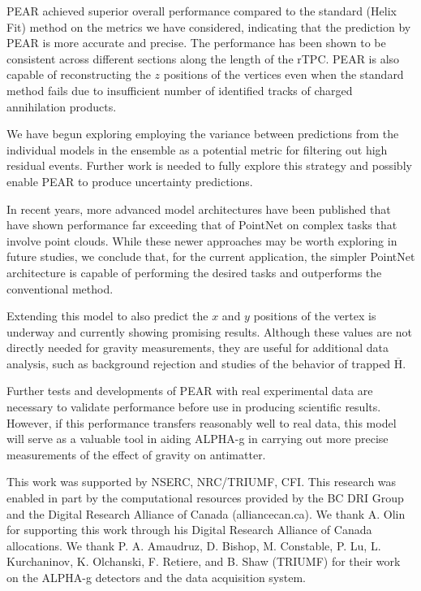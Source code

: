 \documentclass[a4paper,11pt]{article}
\begin{document}
PEAR achieved superior overall performance compared to the standard (Helix Fit) method on the metrics we have considered, indicating that the prediction by PEAR is more accurate and precise. The performance has been shown to be consistent across different sections along the length of the rTPC. PEAR is also capable of reconstructing the $z$ positions of the vertices even when the standard method fails due to insufficient number of identified tracks of charged annihilation products.

We have begun exploring employing the variance between predictions from the individual models in the ensemble as a potential metric for filtering out high residual events. Further work is needed to fully explore this strategy and possibly enable PEAR to produce uncertainty predictions.

In recent years, more advanced model architectures have been published \cite{pointnetpp, pointtransformerv3} that have shown performance far exceeding that of PointNet on complex tasks that involve point clouds. While these newer approaches may be worth exploring in future studies, we conclude that, for the current application, the simpler PointNet architecture is capable of performing the desired tasks and outperforms the conventional method.

Extending this model to also predict the $x$ and $y$ positions of the vertex is underway and currently showing promising results. Although these values are not directly needed for gravity measurements, they are useful for additional data analysis, such as background rejection and studies of the behavior of trapped $\overline{\mathrm{H}}$. 

Further tests and developments of PEAR with real experimental data are necessary to validate performance before use in producing scientific results. However, if this performance transfers reasonably well to real data, this model will serve as a valuable tool in aiding ALPHA-g in carrying out more precise measurements of the effect of gravity on antimatter.  

\FloatBarrier

\acknowledgments
This work was supported by NSERC, NRC/TRIUMF, CFI. 
This research was enabled in part by the computational resources provided by the BC DRI Group and the Digital Research Alliance of Canada (alliancecan.ca). We thank A. Olin for supporting this work through his Digital Research Alliance of Canada allocations.
We thank P. A. Amaudruz, D. Bishop, M. Constable, P. Lu, L. Kurchaninov, K. Olchanski, F. Retiere, and B. Shaw (TRIUMF) for their work on the ALPHA-g detectors and the data acquisition system.
\end{document}

